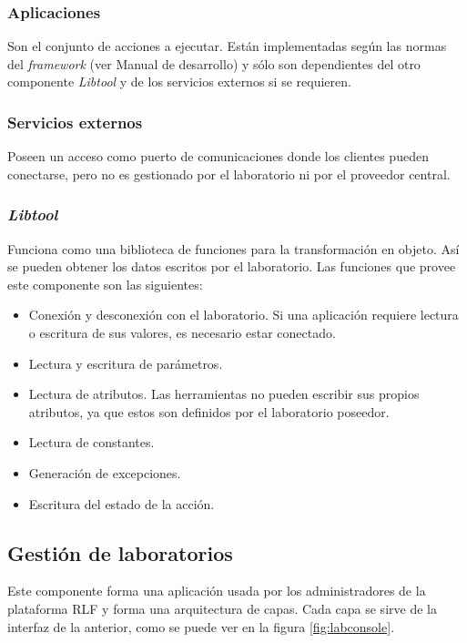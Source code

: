 \subsubsection{Aplicaciones}
Son el conjunto de acciones a ejecutar. Están implementadas según las 
normas del \emph{framework} (ver Manual de desarrollo) y sólo son 
dependientes del otro componente \emph{Libtool} y de los servicios 
externos si se requieren.

\subsubsection{Servicios externos}
Poseen un acceso como puerto de comunicaciones donde los clientes 
pueden conectarse, pero no es gestionado por el laboratorio ni por el 
proveedor central.

\subsubsection{\emph{Libtool}}
Funciona como una biblioteca de funciones para la transformación en 
objeto. Así se pueden obtener los datos escritos por el laboratorio. 
Las funciones que provee este componente son las siguientes:

\begin{itemize}
\item Conexión y desconexión con el laboratorio. Si una aplicación 
requiere lectura o escritura de sus valores, es necesario estar 
conectado.
\item Lectura y escritura de parámetros.
\item Lectura de atributos. Las herramientas no pueden escribir sus 
propios atributos, ya que estos son definidos por el laboratorio 
poseedor.
\item Lectura de constantes.
\item Generación de excepciones.
\item Escritura del estado de la acción.
\end{itemize}

\subsection{Gestión de laboratorios}
Este componente forma una aplicación usada por los administradores de 
la plataforma RLF y forma una arquitectura de capas. Cada capa se 
sirve de la interfaz de la anterior, como se puede ver en la figura 
\ref{fig:labconsole}.

